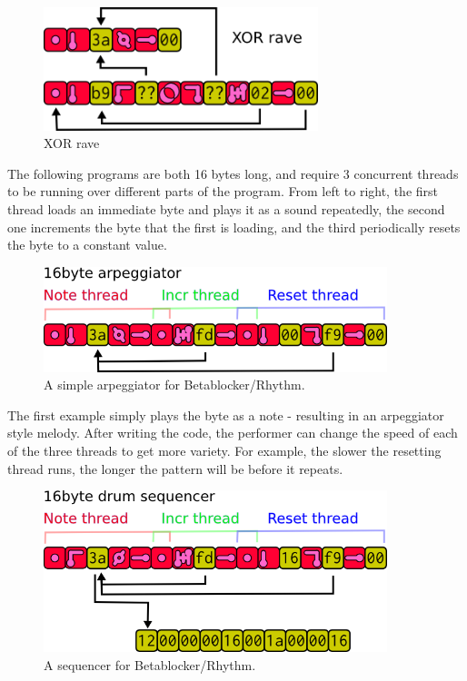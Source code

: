 \documentclass[letterpaper, 12pt]{article}
\begin{document}
\begin{figure}[H]
	\centering
		\includegraphics[width=8cm]{bbds-xorrave}
	\caption{XOR rave}
	\label{fig:fig_bbds-xorrave}
\end{figure}

The following programs are both 16 bytes long, and require 3 concurrent threads to be running over different parts of the program. From left to right, the first thread loads an immediate byte and plays it as a sound repeatedly, the second one increments the byte that the first is loading, and the third periodically resets the byte to a constant value.
 
\begin{figure}[H]
	\centering
		\includegraphics[width=10cm]{bbds-arp}
	\caption{A simple arpeggiator for Betablocker/Rhythm.}
	\label{fig:fig_bbds-arp}
\end{figure}

The first example simply plays the byte as a note - resulting in an arpeggiator style melody. After writing the code, the performer can change the speed of each of the three threads to get more variety. For example, the slower the resetting thread runs, the longer the pattern will be before it repeats.

\begin{figure}[H]
	\centering
		\includegraphics[width=10cm]{bbds-seq}
	\caption{A sequencer for Betablocker/Rhythm.}
	\label{fig:fig_bbds-seq}
\end{figure}
\end{document}
